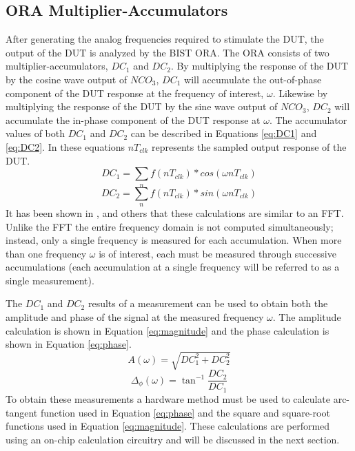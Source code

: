 \documentclass[12pt]{report}
\begin{document}
\subsection{ORA Multiplier-Accumulators}
\label{sct:bist-ora}
After generating the analog frequencies required to stimulate the DUT, the output of the DUT is analyzed by the BIST ORA.  The ORA consists of two multiplier-accumulators, $DC_1$ and $DC_2$\cite{basessa}.  By multiplying the response of the DUT by the cosine wave output of $NCO_3$, $DC_1$ will accumulate the out-of-phase component of the DUT response at the frequency of interest, $\omega$.  Likewise by multiplying the response of the DUT by the sine wave output of $NCO_3$, $DC_2$ will accumulate the in-phase component of the DUT response at $\omega$.  The accumulator values of both $DC_1$ and $DC_2$ can be described in Equations \ref{eq:DC1} and \ref{eq:DC2}. In these equations $nT_{clk}$ represents the sampled output response of the DUT\cite{stroud-phase}.  
\begin{equation}
DC_1 = \sum_{n} f(nT_{clk})*cos(\omega nT_{clk})
\label{eq:DC1}
\end{equation}
\begin{equation}
DC_2 = \sum_{n} f(nT_{clk})*sin(\omega nT_{clk})
\label{eq:DC2}
\end{equation}
It has been shown in \cite{jie},\cite{stroud-phase} and others that these calculations are similar to an FFT.  Unlike the FFT the entire frequency domain is not computed simultaneously; instead,  only a single frequency is measured for each accumulation\cite{stroud-phase}.  When more than one frequency $\omega$ is of interest, each must be measured through successive accumulations (each accumulation at a single frequency will be referred to as a single measurement).  

The $DC_1$ and $DC_2$ results of a measurement can be used to obtain both the amplitude and phase of the signal at the measured frequency $\omega$.  The amplitude calculation is shown in Equation \ref{eq:magnitude} and the phase calculation is shown in Equation \ref{eq:phase}\cite{jie}.
\begin{equation}
  A(\omega) = \sqrt{DC_1^2+DC_2^2}
  \label{eq:magnitude}
\end{equation}
\begin{equation}
  \Delta_\phi(\omega) = \tan^{-1}\frac{DC_2}{DC_1}
  \label{eq:phase}
\end{equation}
To obtain these measurements a hardware method must be used to calculate arc-tangent function used in Equation \ref{eq:phase} and the square and square-root functions used in Equation \ref{eq:magnitude}.  These calculations are performed using an on-chip calculation circuitry and will be discussed in the next section.
\end{document}
